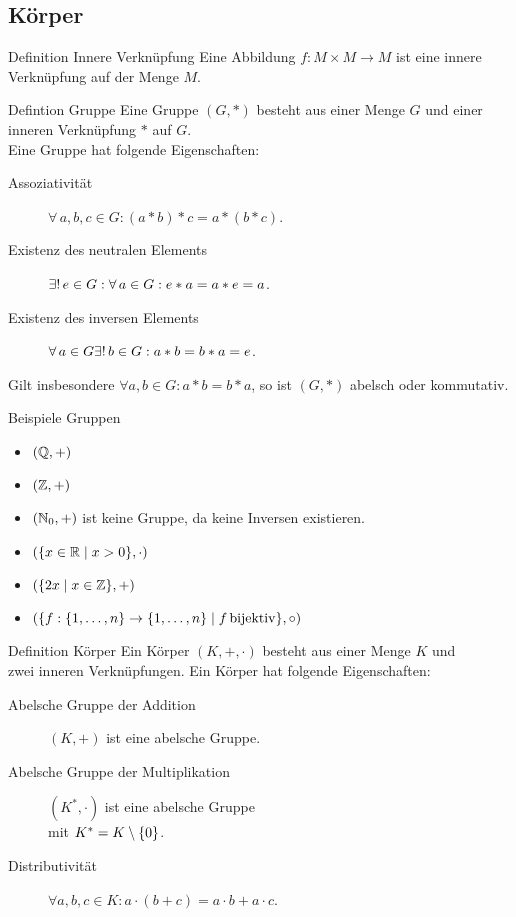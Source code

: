 \documentclass[main.tex]{subfiles}
\begin{document}
\subsection*{Körper}
\begin{karte}{Definition Innere Verknüpfung}
    Eine Abbildung \(f: M \times M \rightarrow M\) 
    ist eine innere Verknüpfung auf der Menge \(M\).
\end{karte}
\begin{karte}{Defintion Gruppe}
    Eine Gruppe \( (G,*) \) besteht aus einer Menge 
    \(G\) und einer inneren Verknüpfung \(*\) auf \(G\).\\
    Eine Gruppe hat folgende Eigenschaften: 
    \begin{description}
        \item[Assoziativität] 
        \( \forall \, a,b,c \in G : 
        (a * b) * c = a * (b * c) \).
        \item[Existenz des neutralen Elements] 
        \( \exists! \, e \in G :\forall \, a \in G : 
        e*a = a*e = a \).
        \item[Existenz des inversen Elements] 
        \( \forall \, a \in G \exists! \, b \in G : 
        a * b = b * a = e \). 
    \end{description}
    Gilt insbesondere \(\forall a,b \in G : 
    a * b = b * a \), so ist \( (G,*) \) abelsch 
    oder kommutativ. 
\end{karte}
\begin{karte}{Beispiele Gruppen}
    \begin{itemize}
        \item \( (\mathbb{Q}, +) \)
        \item \( (\mathbb{Z}, +) \)
        \item \( (\mathbb{N}_0, +) \) ist keine Gruppe, da keine 
        Inversen existieren.
        \item \( (\{ x\in\mathbb{R} \;\vert \; x > 0 \}, \cdot) \)
        \item \( (\{2x \;\vert \; x \in \mathbb{Z}\}, +) \)
        \item \( ( \{ f: \{1,\ldots,n\} \rightarrow 
        \{1,\ldots,n\} \;\vert \; f \operatorname{bijektiv} \}, \circ ) \)
    \end{itemize}
\end{karte}
\begin{karte}{Definition Körper}
    Ein Körper \( (K,+,\cdot) \) besteht aus einer Menge 
    \(K\) und \\ 
    zwei inneren Verknüpfungen. Ein Körper hat folgende Eigenschaften: 
    \begin{description}
        \item[Abelsche Gruppe der Addition] 
        \( (K,+) \) ist eine abelsche Gruppe.
        \item[Abelsche Gruppe der Multiplikation]
        \( (K^*,\cdot) \) ist eine abelsche Gruppe\\
        mit \(K^* = K \setminus \{0\}\).
        \item[Distributivität]
        \( \forall a,b,c \in K : 
        a \cdot (b + c) = a \cdot b + a \cdot c\).
    \end{description}
\end{karte}
\end{document}

